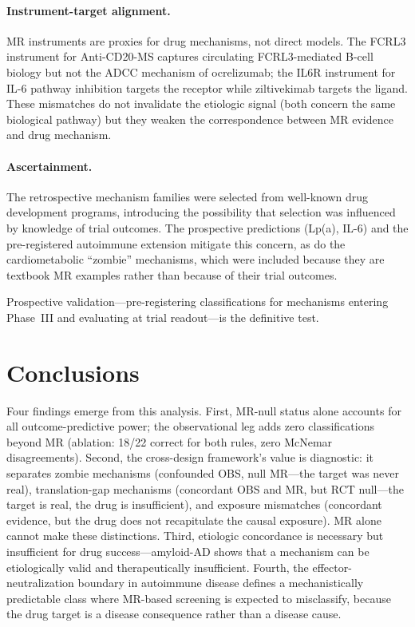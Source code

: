 \documentclass[11pt]{article}
\begin{document}
\paragraph{Instrument-target alignment.} MR instruments are proxies for drug mechanisms, not direct models. The FCRL3 instrument for Anti-CD20-MS captures circulating FCRL3-mediated B-cell biology but not the ADCC mechanism of ocrelizumab; the IL6R instrument for IL-6 pathway inhibition targets the receptor while ziltivekimab targets the ligand. These mismatches do not invalidate the etiologic signal (both concern the same biological pathway) but they weaken the correspondence between MR evidence and drug mechanism.

\paragraph{Ascertainment.} The retrospective mechanism families were selected from well-known drug development programs, introducing the possibility that selection was influenced by knowledge of trial outcomes. The prospective predictions (Lp(a), IL-6) and the pre-registered autoimmune extension mitigate this concern, as do the cardiometabolic ``zombie'' mechanisms, which were included because they are textbook MR examples rather than because of their trial outcomes.

Prospective validation---pre-registering classifications for mechanisms entering Phase~III and evaluating at trial readout---is the definitive test.

\section{Conclusions}

Four findings emerge from this analysis. First, MR-null status alone accounts for all outcome-predictive power; the observational leg adds zero classifications beyond MR (ablation: 18/22 correct for both rules, zero McNemar disagreements). Second, the cross-design framework's value is diagnostic: it separates zombie mechanisms (confounded OBS, null MR---the target was never real), translation-gap mechanisms (concordant OBS and MR, but RCT null---the target is real, the drug is insufficient), and exposure mismatches (concordant evidence, but the drug does not recapitulate the causal exposure). MR alone cannot make these distinctions. Third, etiologic concordance is necessary but insufficient for drug success---amyloid-AD shows that a mechanism can be etiologically valid and therapeutically insufficient. Fourth, the effector-neutralization boundary in autoimmune disease defines a mechanistically predictable class where MR-based screening is expected to misclassify, because the drug target is a disease consequence rather than a disease cause.
\end{document}
